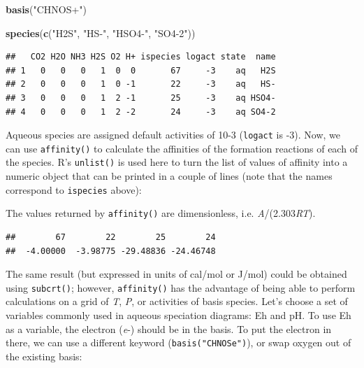 \documentclass[]{tufte-book}
\newenvironment{Shaded}{}{}
\newcommand{\KeywordTok}[1]{\textcolor[rgb]{0.00,0.44,0.13}{\textbf{#1}}}
\newcommand{\StringTok}[1]{\textcolor[rgb]{0.25,0.44,0.63}{#1}}
\newcommand{\OperatorTok}[1]{\textcolor[rgb]{0.40,0.40,0.40}{#1}}
\newcommand{\NormalTok}[1]{#1}
\begin{document}
\begin{Shaded}
\begin{Highlighting}[]
\KeywordTok{basis}\NormalTok{(}\StringTok{"CHNOS+"}\NormalTok{)}
\end{Highlighting}
\end{Shaded}

\begin{Shaded}
\begin{Highlighting}[]
\KeywordTok{species}\NormalTok{(}\KeywordTok{c}\NormalTok{(}\StringTok{"H2S"}\NormalTok{, }\StringTok{"HS-"}\NormalTok{, }\StringTok{"HSO4-"}\NormalTok{, }\StringTok{"SO4-2"}\NormalTok{))}
\end{Highlighting}
\end{Shaded}

\begin{verbatim}
##   CO2 H2O NH3 H2S O2 H+ ispecies logact state  name
## 1   0   0   0   1  0  0       67     -3    aq   H2S
## 2   0   0   0   1  0 -1       22     -3    aq   HS-
## 3   0   0   0   1  2 -1       25     -3    aq HSO4-
## 4   0   0   0   1  2 -2       24     -3    aq SO4-2
\end{verbatim}

Aqueous species are assigned default activities of 10-3 (\texttt{logact}
is -3). Now, we can use {\texttt{affinity()}} to calculate the
affinities of the formation reactions of each of the species. R's
\texttt{unlist()} is used here to turn the list of values of affinity
into a numeric object that can be printed in a couple of lines (note
that the names correspond to \texttt{ispecies} above):

\begin{marginfigure}
The values returned by {\texttt{affinity()}} are dimensionless, i.e.
\emph{A}/(2.303\emph{RT}).
\end{marginfigure}

\begin{Shaded}
\end{Shaded}

\begin{verbatim}
##        67        22        25        24 
##  -4.00000  -3.98775 -29.48836 -24.46748
\end{verbatim}

The same result (but expressed in units of cal/mol or J/mol) could be
obtained using {\texttt{subcrt()}}; however, {\texttt{affinity()}} has
the advantage of being able to perform calculations on a grid of
\emph{T}, \emph{P}, or activities of basis species. Let's choose a set
of variables commonly used in aqueous speciation diagrams: Eh and pH. To
use Eh as a variable, the electron (\emph{e}-) should be in the basis.
To put the electron in there, we can use a different keyword
({\texttt{basis("CHNOSe")}}), or swap oxygen out of the existing basis:
\end{document}

